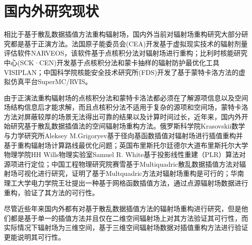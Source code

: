 \section{国内外研究现状}
相比于基于散乱数据插值方法重构辐射场，国内外当前对辐射场重构研究大部分研究都是基于正演方法。法国原子能委员会(CEA)开发基于虚拟现实技术的辐射剂量评估软件NARVEOS\textsuperscript{\cite{osti_22030167}}，该软件基于点核积分法对辐射场进行重构；比利时核能研究中心(SCK·CEN)开发基于点核积分法和蒙卡抽样的辐射防护最优化工具VISIPLAN\textsuperscript{\cite{vermeersch2000software}}；中国科学院核能安全技术研究所(FDS)开发了基于蒙特卡洛方法的虚拟仿真平台SuperMC/RVIS\textsuperscript{\cite{hevirtual}}。

由于正演法重构辐射场的点核积分法和蒙特卡洛法都必须在了解源项信息以及空间场结构信息后才能求解，而且点核积分法不适用于复杂的源项和空间场，蒙特卡洛方法对屏蔽较厚的场景无法得出可靠的结果以及计算时间过长，近年来，国内外开始研究基于散乱数据插值法的空间辐射场重构方法。俄罗斯科学院Krasovskii数学与力学研究所Aleksey M.Grigoryev基于径向基函数插值对辐射场进行插值重构并基于重构辐射场计算路线最优化问题\textsuperscript{\cite{Grigoryev2020Determination}}；英国布里斯托尔廷德尔大道布里斯托尔大学物理学院HH Wills物理实验室Samuel R. White基于投影线性重建（PLR）算法对源项进行定位\textsuperscript{\cite{s21030807}}；中国工程物理研究院赛雪基于Multiquadric散乱数据插值方法对辐射场可视化进行研究\textsuperscript{\cite{赛雪2017基于散乱数据插值方法的γ辐射场可视化技术研究}}，证明了基于Multquadric方法对辐射场重构是可行的；华南理工大学电力学院王壮提出一种基于网格函数插值方法\textsuperscript{\cite{WANG201827}}，通过点源辐射场数据进行重构，验证了其方法的可行性。

尽管近些年来国内外都有对基于散乱数据插值方法的辐射场重构进行研究，但是他们都是基于单一的插值方法并且仅在二维空间辐射场上对其方法验证其可行性，而实际情况下辐射场为三维空间，基于三维空间辐射场数据对插值重构方法进行验证更能说明其可行性。